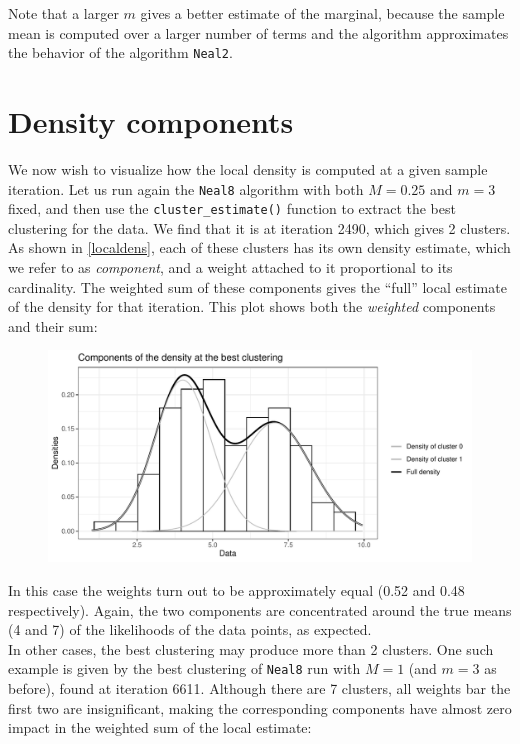 Note that a larger $m$ gives a better estimate of the marginal, because the sample mean is computed over a larger number of terms and the algorithm approximates the behavior of the algorithm \verb|Neal2|.



\section{Density components}
We now wish to visualize how the local density is computed at a given sample iteration.
Let us run again the \verb|Neal8| algorithm with both $M=0.25$ and $m=3$ fixed, and then use the \verb|cluster_estimate()| function to extract the best clustering for the data.
We find that it is at iteration 2490, which gives 2 clusters.
As shown in \ref{localdens}, each of these clusters has its own density estimate, which we refer to as \emph{component}, and a weight attached to it proportional to its cardinality.
The weighted sum of these components gives the ``full'' local estimate of the density for that iteration.
This plot shows both the \emph{weighted} components and their sum:
\begin{figure}[h]
	\centering
	\includegraphics[scale=0.7]{etc/componentsM025m3_best.pdf}
\end{figure}

In this case the weights turn out to be approximately equal (0.52 and 0.48 respectively).
Again, the two components are concentrated around the true means (4 and 7) of the likelihoods of the data points, as expected. \\
In other cases, the best clustering may produce more than 2 clusters.
One such example is given by the best clustering of \verb|Neal8| run with $M=1$ (and $m=3$ as before), found at iteration 6611.
Although there are 7 clusters, all weights bar the first two are insignificant, making the corresponding components have almost zero impact in the weighted sum of the local estimate:

